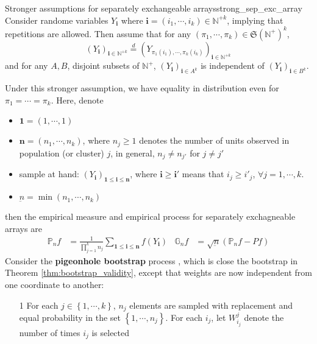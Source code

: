 \documentclass[twoside]{article}
\begin{document}
\begin{itemize}
    \begin{assumption}{Stronger assumptions for separately exchangeable arrays}{strong_sep_exc_array}
        Consider randome variables $Y_{\mathbf{i}}$ where $\mathbf{i}=\left(i_1,\cdots,i_k\right) \in \mathbb{N}^{+k}$, implying that repetitions are allowed. Then assume that for any $\left(\pi_1,\cdots,\pi_k\right)\in\mathfrak{S}\left(\mathbb{N}^+\right)^k$,
        $$ \left(Y_{\mathbf{i}}\right)_{\mathbf{i}\in\mathbb{N}^{+k}} \overset{d}{=} \left(Y_{\pi_1(i_1),\cdots,\pi_k(i_k)}\right)_{\mathbf{i}\in\mathbb{N}^{+k}} $$
        and for any $A,B$, disjoint subsets of $\mathbb{N}^+$, $\left(Y_{\mathbf{i}}\right)_{\mathbf{i}\in A^k}$ is independent of $\left(Y_{\mathbf{i}}\right)_{\mathbf{i}\in B^k}$.
    \end{assumption}
    Under this stronger assumption, we have equality in distribution even for $\pi_1 = \cdots =\pi_k$. Here, denote 
    \begin{itemize}
        \item $\mathbf{1} = \left(1,\cdots,1\right)$
        \item $\mathbf{n} = \left(n_1,\cdots,n_k\right)$, where $n_j\geq 1$ denotes the number of units observed in population (or cluster) $j$, in general, $n_j\neq n_{j'}$ for $j\neq j'$
        \item sample at hand: $\left(Y_{\mathbf{i}}\right)_{\mathbf{1\leq i\leq n}}$, where $\mathbf{i}\geq \mathbf{i}'$ means that $i_j\geq i'_j$, $\forall j=1,\cdots,k$.
        \item $\underbar{n} = \min\left(n_1,\cdots,n_k\right)$
    \end{itemize}
    then the empirical measure and empirical process for separately exchagneable arrays are 
    \begin{align*}
        \mathbb{P}_nf &=\frac{1}{\prod^k_{j=1}n_j}\sum_{\mathbf{1\leq i\leq n}}f(Y_{\mathbf{i}}) & \mathbb{G}_n f& = \sqrt{\underbar{n}}\left(\mathbb{P}_n f-Pf\right)
    \end{align*}
    Consider the \textbf{pigeonhole bootstrap} process \citep{mccullagh2000resampling}, which is close the bootstrap in Theorem \ref{thm:bootstrap_validity}, except that weights are now independent from one coordinate to another:
    \begin{itemize}
        \item[1] For each $j\in \left\{1,\cdots,k\right\}$, $n_j$ elements are sampled with replacement and equal probability in the set $\left\{1,\cdots,n_j\right\}$. For each $i_j$, let $W_{i_j}^j$ denote the number of times $i_j$ is selected 

\end{itemize}
\end{itemize}
\end{document}
